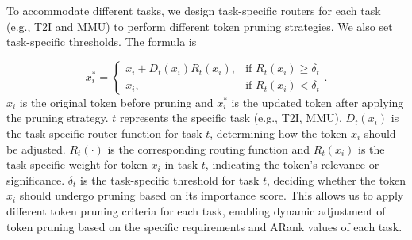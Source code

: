 To accommodate different tasks, we design task-specific routers for each task (e.g., T2I and MMU) to perform different token pruning strategies. We also set task-specific thresholds. The formula is 

\begin{equation}
x_i^{*} =
\begin{cases}
x_i + D_t(x_i) R_t(x_i), & \text{if } R_t(x_i) \geq \delta_t \\
x_i, & \text{if } R_t(x_i) < \delta_t
\end{cases}
.
\end{equation}
\textbf{$x_i$} is the original token before pruning and \textbf{$x_i^{*}$} is the updated token after applying the pruning strategy. \textbf{$t$} represents the specific task (e.g., T2I, MMU). \textbf{$D_t(x_i)$} is the task-specific router function for task \( t \), determining how the token \( x_i \) should be adjusted. \textbf{$R_t(\cdot)$} is the corresponding routing function and \textbf{$R_t(x_i)$} is the task-specific weight for token \( x_i \) in task \( t \), indicating the token's relevance or significance. \textbf{$\delta_t$} is the task-specific threshold for task \( t \), deciding whether the token \( x_i \) should undergo pruning based on its importance score. This allows us to apply different token pruning criteria for each task, enabling dynamic adjustment of token pruning based on the specific requirements and ARank values of each task.




% 




















